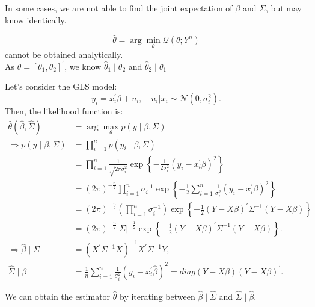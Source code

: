 In some cases, we are not able to find the joint expectation of $\beta$ and $\Sigma$, but may know identically.

\begin{eg}
    $$\hat{\theta} = \arg \min_{\theta} \mathcal{Q}(\theta; Y^n)$$ cannot be obtained analytically.\\
    As $\theta = [\theta_1, \theta_2]^{\prime}$, we know $\hat{\theta}_1 \mid \theta_2$ and $\hat{\theta}_2 \mid \theta_1$
\end{eg}

Let's consider the GLS model:
\[
y_i = x_i^{\prime} \beta + u_i, \quad u_i|x_i \sim \mathcal{N}(0, \sigma_i^2).
\]
Then, the likelihood function is:
\begin{align*}
    \hat{\theta}\left(\hat{\beta}, \hat{\Sigma}\right) &= \arg \max_{\theta} p\left(y \mid \beta, \Sigma\right) \\
    \Rightarrow p\left(y \mid \beta, \Sigma\right) &= \prod_{i=1}^{n} p\left(y_i \mid \beta, \Sigma\right) \\
    &= \prod_{i=1}^{n} \frac{1}{\sqrt{2\pi \sigma_i^2}} \exp\left\{-\frac{1}{2\sigma_i^2} \left(y_i - x_i^{\prime} \beta\right)^2\right\} \\
    &= \left(2\pi\right)^{-\frac{n}{2}} \prod_{i=1}^{n} \sigma_i^{-1} \exp\left\{-\frac{1}{2} \sum_{i=1}^{n} \frac{1}{\sigma_i^2} \left(y_i - x_i^{\prime} \beta\right)^2\right\} \\
    &= \left(2\pi\right)^{-\frac{n}{2}} \left(\prod_{i=1}^{n} \sigma_i^{-1}\right) \exp\left\{-\frac{1}{2} \left(Y - X \beta\right)^{\prime} \Sigma^{-1} \left(Y - X \beta\right)\right\}\\
    &= \left(2\pi\right)^{-\frac{n}{2}} \vert \Sigma \vert ^{-\frac{1}{2}} \exp\left\{-\frac{1}{2} \left(Y - X \beta\right)^{\prime} \Sigma^{-1} \left(Y - X \beta\right)\right\}. \\
    \Rightarrow \hat{\beta} \mid \Sigma &= \left(X^{\prime} \Sigma^{-1} X\right)^{-1}X^{\prime} \Sigma^{-1}Y,\\
    \hat{\Sigma} \mid \beta &= \frac{1}{n} \sum_{i=1}^{n} \frac{1}{\sigma_i^2}\left(y_i - x_i^{\prime} \hat{\beta}\right)^2 = diag{(Y-X \beta)(Y - X \beta)^{\prime}}.
\end{align*}

We can obtain the estimator $\hat{\theta}$ by iterating between $\hat{\beta} \mid \hat{\Sigma}$ and $\hat{\Sigma} \mid \hat{\beta}$.

